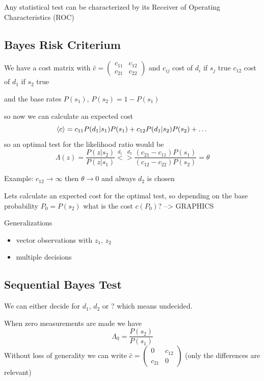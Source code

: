 \documentclass{notebook}
\begin{document}
Any statistical test can be characterized by its Receiver of Operating Characteristics (ROC)

\subsection*{Bayes Risk Criterium}

We have a cost matrix with $\hat{c} = \begin{pmatrix} c_{11} & c_{12} \\ c_{21} & c_{22} \end{pmatrix}$ and $c_{ij}$ cost of $d_i$ if $s_j$ true
$c_{12}$ cost of $d_1$ if $s_2$ true

and the base rates $P(s_1)$, $P(s_2) = 1-P(s_1)$

so now we can calculate an expected cost
%
\begin{equation}
	\expval{c} = c_{11} P(d_1|s_1) P(s_1) +  c_{12} P(d_1|s_2) P(s_2) + \dots
\end{equation}
%
so an optimal test for the likelihood ratio would be
%
\begin{equation}
\Lambda(z) = \frac{P(z|s_2)}{P(z|s_1)} \overset{d_1}{<} \overset{d_2}{>} \frac{(c_{21}-c_{11}) P(s_1)}{(c_{12}-c_{22}) P(s_2)} = \theta
\end{equation}
%

Example: $c_{12} \to \infty$ then $\theta \to 0$ and always $d_2$ is chosen

Lets calculate an expected cost for the optimal test, so depending on the base probability $P_0 = P(s_2)$ what is the cost $c(P_0)$? --> GRAPHICS

Generalizations 

\begin{itemize}
	\item vector observations with $z_1$, $z_2$
	\item multiple decisions
\end{itemize}

\subsection*{Sequential Bayes Test}

We can either decide for $d_1$, $d_2$ or $?$ which means undecided.

When zero measurements are made we have
%
\begin{equation}
	\Lambda_0 = \frac{P(s_2)}{P(s_1)}
\end{equation}
%
Without loss of generality we can write  $\hat{c} = \begin{pmatrix} 0 & c_{12} \\ c_{21} & 0 \end{pmatrix}$ (only the differences are relevant)
\end{document}
